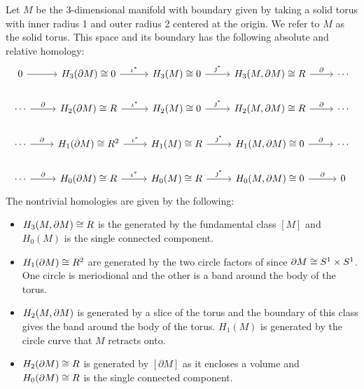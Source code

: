 \documentclass{article}
\begin{document}
Let $M$ be the 3-dimensional manifold with boundary given by taking a solid torus with inner radius 1 and outer radius 2 centered at the origin. We refer to $M$ as the solid torus. This space and its boundary has the following absolute and relative homology:
\[
\begin{tikzcd}
0 \arrow[r]                          & H_3(\partial M)\cong 0 \arrow[r, "\iota^*"]            & H_3(M)\cong 0 \arrow[r, "\jmath^*"]          & {H_3(M,\partial M)\cong R} \arrow[r, "\partial"]          & \cdots \\
\cdots \arrow[r, "\partial"] & H_2(\partial M)\cong R \arrow[r, "\iota^*"]   & H_2(M) \cong 0 \arrow[r, "\jmath^*"]         & {H_2(M,\partial M)\cong R} \arrow[r, "\partial"] & \cdots \\
\cdots \arrow[r, "\partial"] & H_1(\partial M)\cong R^2 \arrow[r, "\iota^*"] & H_1(M)\cong R \arrow[r, "\jmath^*"] & {H_1(M,\partial M)\cong 0} \arrow[r, "\partial"]          & \cdots \\
\cdots \arrow[r, "\partial"] & H_0(\partial M)\cong R \arrow[r, "\iota^*"]   & H_0(M)\cong R \arrow[r, "\jmath^*"] & {H_0(M,\partial M)\cong 0} \arrow[r, "\partial"]          & 0     
\end{tikzcd}
\]
The nontrivial homologies are given by the following:
\begin{itemize}
    \item $H_3(M,{\partial M})\cong R$ is the generated by the fundamental class $[M]$ and $H_0(M)$ is the single connected component.
    \item $H_1({\partial M}) \cong R^2$ are generated by the two circle factors of since ${\partial M} \cong S^1 \times S^1$. One circle is meriodional and the other is a band around the body of the torus.
    \item $H_2(M,{\partial M})$ is generated by a slice of the torus and the boundary of this class gives the band around the body of the torus. $H_1(M)$ is generated by the circle curve that $M$ retracts onto.
    \item $H_2({\partial M}) \cong R$ is generated by $[\partial M]$ as it encloses a volume and $H_0({\partial M})\cong R$ is the single connected component.
\end{itemize}
\end{document}
